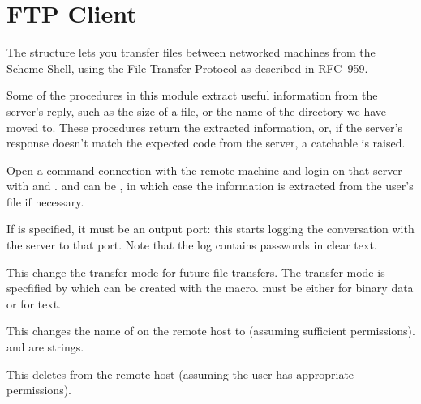 \chapter{FTP Client}\label{cha:ftp}

The  structure lets you transfer files between networked
machines from the Scheme Shell, using the File Transfer Protocol as
described in RFC~959.

Some of the procedures in this module extract useful information from
the server's reply, such as the size of a file, or the name of the
directory we have moved to.  These procedures return the extracted
information, or, if the server's response doesn't match the expected
code from the server, a catchable  is raised.

\begin{desc}
  Open a command connection with the remote machine  and
  login on that server with  and .
   and  can be \sharpf, in which case the
  information is extracted from the user's  file if necessary.
  
  If  is specified, it must be an output port: this
  starts logging the conversation with the server to that port.  Note
  that the log contains passwords in clear text.
\end{desc}

\begin{desc}
  This change the transfer mode for future file transfers.  The
  transfer mode is specfified by  which can be created
  with the  macro.   must be either
   for binary data or  for text.
\end{desc}

\begin{desc}
  This changes the name of  on the remote host to 
  (assuming sufficient permissions).  and  are
  strings.
\end{desc}

\begin{desc}
  This deletes  from the remote host (assuming the user has
  appropriate permissions).
\end{desc}

